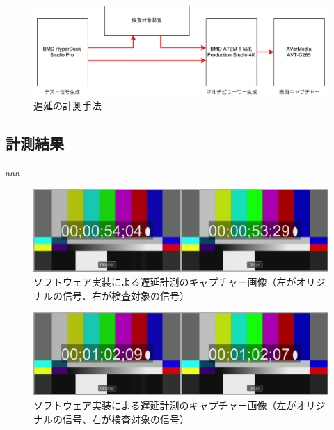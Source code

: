 \begin{figure}[htbp]
  \begin{center}
    \includegraphics[bb=0 0 697 212,width=15cm]{img/evaluate-diagram.pdf}
  \end{center}
  \caption{遅延の計測手法}
  \label{fig:evaluate-diagram}
\end{figure}

\subsection{計測結果}

aaa

\begin{figure}[htbp]
  \begin{center}
    \includegraphics[bb=0 0 1920 540,width=14cm]{img/evaluate-delay-software-1.png}
  \end{center}
  \caption[ソフトウェア実装による遅延計測のキャプチャー画像]{ソフトウェア実装による遅延計測のキャプチャー画像（左がオリジナルの信号、右が検査対象の信号）}
  \label{fig:evaluate-delay-software-1}
\end{figure}

\begin{figure}[htbp]
  \begin{center}
    \includegraphics[bb=0 0 1920 540,width=14cm]{img/evaluate-delay-software-2.png}
  \end{center}
  \caption[ソフトウェア実装による遅延計測のキャプチャー画像]{ソフトウェア実装による遅延計測のキャプチャー画像（左がオリジナルの信号、右が検査対象の信号）}
  \label{fig:evaluate-delay-software-2}
\end{figure}

